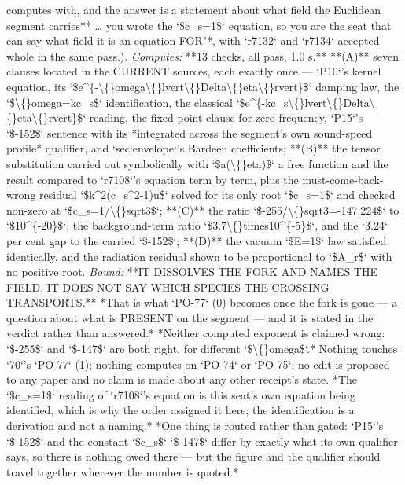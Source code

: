 \begin{description}
computes with, and the answer is a statement about what field the Euclidean segment carries** \ldots{} you wrote the `\$c\_s=1\$` equation, so you are the seat that can say what field it is an equation FOR"*, with `r7132` and `r7134` accepted whole in the same pass.). 
\emph{Computes:} **13 checks, all pass, 1.0 s.** **(A)** seven clauses located in the CURRENT sources, each exactly once --- `P10`'s kernel equation, its `\$e\textasciicircum{}\{-\textbackslash\{\}omega\textbackslash\{\}lvert\textbackslash\{\}Delta\textbackslash\{\}eta\textbackslash\{\}rvert\}\$` damping law, the `\$\textbackslash\{\}omega=kc\_s\$` identification, the classical `\$e\textasciicircum{}\{-kc\_s\textbackslash\{\}lvert\textbackslash\{\}Delta\textbackslash\{\}eta\textbackslash\{\}rvert\}\$` reading, the fixed-point clause for zero frequency, `P15`'s `\$-152\$` sentence with its *integrated across the segment's own sound-speed profile* qualifier, and `sec:envelope`'s Bardeen coefficients; **(B)** the tensor substitution carried out symbolically with `\$a(\textbackslash\{\}eta)\$` a free function and the result compared to `r7108`'s equation term by term, plus the must-come-back-wrong residual `\$k\textasciicircum{}2(c\_s\textasciicircum{}2-1)u\$` solved for its only root `\$c\_s=1\$` and checked non-zero at `\$c\_s=1/\textbackslash\{\}sqrt3\$`; **(C)** the ratio `\$-255/\textbackslash\{\}sqrt3=-147.224\$` to `\$10\textasciicircum{}\{-20\}\$`, the background-term ratio `\$3.7\textbackslash\{\}times10\textasciicircum{}\{-5\}\$`, and the `3.24` per cent gap to the carried `\$-152\$`; **(D)** the vacuum `\$E=1\$` law satisfied identically, and the radiation residual shown to be proportional to `\$A\_r\$` with no positive root.
 \emph{Bound:}  **IT DISSOLVES THE FORK AND NAMES THE FIELD. IT DOES NOT SAY WHICH SPECIES THE CROSSING TRANSPORTS.**  *That is what `PO-77` (0) becomes once the fork is gone --- a question about what is PRESENT on the segment --- and it is stated in the verdict rather than answered.*  *Neither computed exponent is claimed wrong: `\$-255\$` and `\$-147\$` are both right, for different `\$\textbackslash\{\}omega\$`.*  Nothing touches `70`'s `PO-77` (1); nothing computes on `PO-74` or `PO-75`; no edit is proposed to any paper and no claim is made about any other receipt's state.  *The `\$c\_s=1\$` reading of `r7108`'s equation is this seat's own equation being identified, which is why the order assigned it here; the identification is a derivation and not a naming.*  *One thing is routed rather than gated: `P15`'s `\$-152\$` and the constant-`\$c\_s\$` `\$-147\$` differ by exactly what its own qualifier says, so there is nothing owed there --- but the figure and the qualifier should travel together wherever the number is quoted.*

\end{description}
